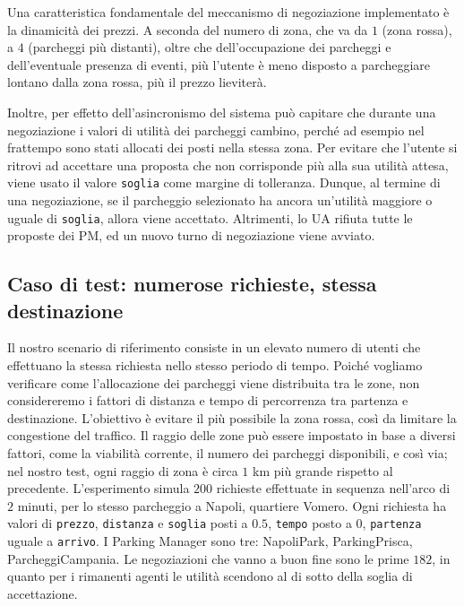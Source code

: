 \documentclass[11pt,a4paper,twoside]{article}
\numberwithin{figure}{section}
\numberwithin{equation}{section}
\begin{document}
Una caratteristica fondamentale del meccanismo di negoziazione implementato è la dinamicità dei prezzi. A seconda del numero di zona, che va da $1$ (zona rossa), a $4$ (parcheggi più distanti), oltre che dell'occupazione dei parcheggi e dell'eventuale presenza di eventi, più l'utente è meno disposto a parcheggiare lontano dalla zona rossa, più il prezzo lieviterà.

Inoltre, per effetto dell'asincronismo del sistema può capitare che durante una negoziazione i valori di utilità dei parcheggi cambino, perché ad esempio nel frattempo sono stati allocati dei posti nella stessa zona. Per evitare che l'utente si ritrovi ad accettare una proposta che non corrisponde più alla sua utilità attesa, viene usato il valore \texttt{soglia} come margine di tolleranza. Dunque, al termine di una negoziazione, se il parcheggio selezionato ha ancora un'utilità maggiore o uguale di \texttt{soglia}, allora viene accettato. Altrimenti, lo UA rifiuta tutte le proposte dei PM, ed un nuovo turno di negoziazione viene avviato.

\subsection{Caso di test: numerose richieste, stessa destinazione}

Il nostro scenario di riferimento consiste in un elevato numero di utenti che effettuano la stessa richiesta nello stesso periodo di tempo. Poiché vogliamo verificare come l'allocazione dei parcheggi viene distribuita tra le zone, non considereremo i fattori di distanza e tempo di percorrenza tra partenza e destinazione. L'obiettivo è evitare il più possibile la zona rossa, così da limitare la congestione del traffico. Il raggio delle zone può essere impostato in base a diversi fattori, come la viabilità corrente, il numero dei parcheggi disponibili, e così via;
nel nostro test, ogni raggio di zona è circa $1$ km più grande rispetto al precedente.
L'esperimento simula $200$ richieste effettuate in sequenza nell'arco di $2$ minuti, per lo stesso parcheggio a Napoli, quartiere Vomero. Ogni richiesta ha valori di \texttt{prezzo}, \texttt{distanza} e \texttt{soglia} posti a $0.5$, \texttt{tempo} posto a $0$, \texttt{partenza} uguale a \texttt{arrivo}.
I Parking Manager sono tre: \textsf{NapoliPark}, \textsf{ParkingPrisca}, \textsf{ParcheggiCampania}.
Le negoziazioni che vanno a buon fine sono le prime $182$, in quanto per i rimanenti agenti le utilità scendono al di sotto della soglia di accettazione.
\end{document}
